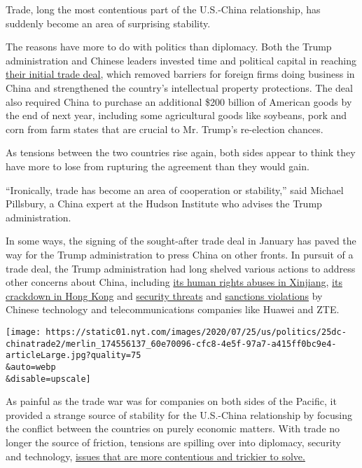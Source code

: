 Trade, long the most contentious part of the U.S.-China relationship,
has suddenly become an area of surprising stability.

The reasons have more to do with politics than diplomacy. Both the Trump
administration and Chinese leaders invested time and political capital
in reaching
\href{https://www.nytimes.com/2020/01/15/business/economy/china-trade-deal.html}{their
initial trade deal}, which removed barriers for foreign firms doing
business in China and strengthened the country's intellectual property
protections. The deal also required China to purchase an additional
\$200 billion of American goods by the end of next year, including some
agricultural goods like soybeans, pork and corn from farm states that
are crucial to Mr. Trump's re-election chances.

As tensions between the two countries rise again, both sides appear to
think they have more to lose from rupturing the agreement than they
would gain.

``Ironically, trade has become an area of cooperation or stability,''
said Michael Pillsbury, a China expert at the Hudson Institute who
advises the Trump administration.

In some ways, the signing of the sought-after trade deal in January has
paved the way for the Trump administration to press China on other
fronts. In pursuit of a trade deal, the Trump administration had long
shelved various actions to address other concerns about China, including
\href{https://www.nytimes.com/2019/05/04/world/asia/trump-china-uighurs-trade-deal.html}{its
human rights abuses in Xinjiang},
\href{https://www.nytimes.com/2019/11/21/us/politics/trump-hong-kong-china.html}{its
crackdown in Hong Kong} and
\href{https://www.nytimes.com/2019/11/15/business/us-reprieve-huawei.html}{security
threats} and
\href{https://www.nytimes.com/2018/06/07/business/us-china-zte-deal.html}{sanctions
violations} by Chinese technology and telecommunications companies like
Huawei and ZTE.

\texttt{[image: https://static01.nyt.com/images/2020/07/25/us/politics/25dc-chinatrade2/merlin\_174556137\_60e70096-cfc8-4e5f-97a7-a415ff0bc9e4-articleLarge.jpg?quality=75\\\&auto=webp\\\&disable=upscale]}

As painful as the trade war was for companies on both sides of the
Pacific, it provided a strange source of stability for the U.S.-China
relationship by focusing the conflict between the countries on purely
economic matters. With trade no longer the source of friction, tensions
are spilling over into diplomacy, security and technology,
\href{https://www.nytimes.com/2020/07/14/world/asia/cold-war-china-us.html}{issues
that are more contentious and trickier to solve.}

